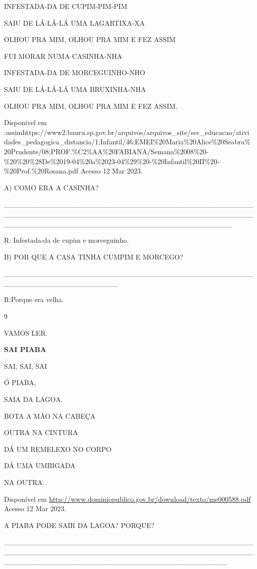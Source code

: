 {{{{{{INFESTADA-DA DE CUPIM-PIM-PIM

SAIU DE LÁ-LÁ-LÁ UMA LAGARTIXA-XA

OLHOU PRA MIM, OLHOU PRA MIM E FEZ ASSIM

FUI MORAR NUMA CASINHA-NHA

INFESTADA-DA DE MORCEGUINHO-NHO

SAIU DE LÁ-LÁ-LÁ UMA BRUXINHA-NHA

OLHOU PRA MIM, OLHOU PRA MIM E FEZ ASSIM.

Disponivel em
:assimhttps://www2.bauru.sp.gov.br/arquivos/arquivos\_site/sec\_educacao/atividades\_pedagogica\_distancia/1;Infantil/46;EMEI\%20Maria\%20Alice\%20Seabra\%20Prudente/08;PROF.\%C2\%AA\%20FABIANA/Semana\%2008\%20-\%20\%20\%28De\%2019-04\%20a\%2023-04\%29\%20-\%20Infantil\%20II\%20-\%20Prof.\%20Rosana.pdf
Acesso 12 Mar 2023.

A) COMO ERA A CASINHA?

\_\_\_\_\_\_\_\_\_\_\_\_\_\_\_\_\_\_\_\_\_\_\_\_\_\_\_\_\_\_\_\_\_\_\_\_\_\_\_\_\_\_\_\_\_\_\_\_\_\_\_\_\_\_\_\_\_\_\_\_\_\_\_\_\_\_\_\_\_\_\_\_\_\_\_\_\_\_\_\_\_\_\_\_\_\_\_\_\_\_\_\_\_\_\_\_\_\_\_\_\_\_\_\_\_\_\_\_\_\_\_\_\_\_\_\_\_\_\_\_\_\_\_\_\_\_\_\_\_\_\_\_\_\_\_\_\_\_\_\_

R: Infestada-da de cupim e morceguinho.

B) POR QUE A CASA TINHA CUMPIM E MORCEGO?

\_\_\_\_\_\_\_\_\_\_\_\_\_\_\_\_\_\_\_\_\_\_\_\_\_\_\_\_\_\_\_\_\_\_\_\_\_\_\_\_\_\_\_\_\_\_\_\_\_\_\_\_\_\_\_\_\_\_\_\_\_\_\_\_\_\_\_\_\_\_

R:Porque era velha.

\num{9}

VAMOS LER.

\textbf{SAI PIABA}

SAI, SAI, SAI

Ó PIABA,

SAIA DA LAGOA.

BOTA A MÃO NA CABEÇA

OUTRA NA CINTURA

DÁ UM REMELEXO NO CORPO

DÁ UMA UMBIGADA

NA OUTRA.

Disponível em
\url{http://www.dominiopublico.gov.br/download/texto/me000588.pdf}
Acesso 12 Mar 2023.

A PIABA PODE SAIR DA LAGOA? PORQUE?

\_\_\_\_\_\_\_\_\_\_\_\_\_\_\_\_\_\_\_\_\_\_\_\_\_\_\_\_\_\_\_\_\_\_\_\_\_\_\_\_\_\_\_\_\_\_\_\_\_\_\_\_\_\_\_\_\_\_\_\_\_\_\_\_\_\_\_\_\_\_\_\_\_\_\_\_\_\_\_\_\_\_\_\_\_\_\_\_\_\_\_\_\_\_\_\_\_\_\_\_\_\_\_\_\_\_\_\_\_\_\_\_\_\_\_\_\_\_\_\_\_\_\_\_\_\_\_\_\_\_\_\_\_\_\_\_\_\_\_

}}}}}}
